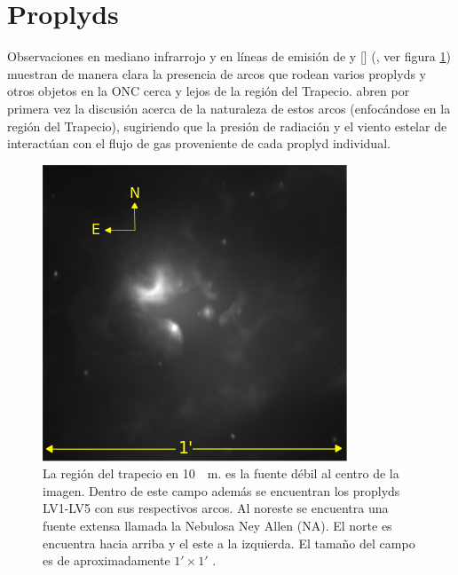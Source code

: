 \section{Proplyds}
Observaciones en mediano infrarrojo y en líneas de emisión de  y [] (\citet{Robberto:2005, Bally:1998, Bally:2000}, ver figura \ref{fig:prop-bally-robberto}) muestran de manera clara la presencia de arcos que rodean varios proplyds y otros objetos en la ONC cerca y lejos de la región del Trapecio. \citet{Hayward:1994} abren por primera vez la discusión acerca de la naturaleza de estos arcos (enfocándose en la región del Trapecio), sugiriendo que la presión de radiación y el viento estelar de \thC{} interactúan con el flujo de gas proveniente de cada proplyd individual.

\begin{figure}
  \centering
  \includegraphics[width=0.7\linewidth]{./Figures/Orion_Robberto}
  \caption[La región del Trapecio]{La región del trapecio en \SI{10}{\mu m}. \thC{} es la fuente débil al centro de la imagen. Dentro de este campo además se encuentran los proplyds LV1-LV5 con sus respectivos arcos. Al noreste se encuentra una fuente extensa llamada la Nebulosa Ney Allen (NA). El norte es encuentra hacia arriba y el este a la izquierda. El tamaño del campo es de aproximadamente $1' \times 1'$ \citep{Robberto:2005}.}
  \label{fig:prop-bally-robberto}
\end{figure}

